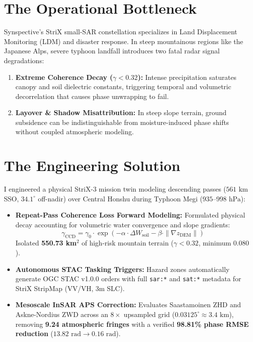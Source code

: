 \documentclass[10pt,letterpaper]{article}
\begin{document}
\noindent
\begin{minipage}[t]{0.51\textwidth}
    \section*{The Operational Bottleneck}
    \footnotesize
    Synspective's StriX small-SAR constellation specializes in Land Displacement Monitoring (LDM) and disaster response. In steep mountainous regions like the Japanese Alps, severe typhoon landfall introduces two fatal radar signal degradations:
    \begin{enumerate}[leftmargin=12pt,topsep=1pt,itemsep=1pt,parsep=0pt]
        \item \textbf{Extreme Coherence Decay ($\gamma < 0.32$):} Intense precipitation saturates canopy and soil dielectric constants, triggering temporal and volumetric decorrelation that causes phase unwrapping to fail.
        \item \textbf{Layover \& Shadow Misattribution:} In steep slope terrain, ground subsidence can be indistinguishable from moisture-induced phase shifts without coupled atmospheric modeling.
    \end{enumerate}

    \section*{The Engineering Solution}
    \footnotesize
    I engineered a physical StriX-3 mission twin modeling descending passes ($561\text{ km}$ SSO, $34.1^\circ$ off-nadir) over Central Honshu during Typhoon Megi ($935\text{--}998\text{ hPa}$):
    \begin{itemize}[leftmargin=12pt,topsep=1pt,itemsep=1pt,parsep=0pt]
        \item \textbf{Repeat-Pass Coherence Loss Forward Modeling:} Formulated physical decay accounting for volumetric water convergence and slope gradients:
        \begin{equation*}
            \gamma_{\text{CCD}} = \gamma_0 \cdot \exp\left(-\alpha \cdot \Delta W_{\text{soil}} - \beta \cdot \|\nabla z_{\text{DEM}}\|\right)
        \end{equation*}
        Isolated \textbf{550.73 km$^2$} of high-risk mountain terrain ($\gamma < 0.32$, minimum $0.080$).
        \item \textbf{Autonomous STAC Tasking Triggers:} Hazard zones automatically generate OGC STAC v1.0.0 orders with full \texttt{sar:*} and \texttt{sat:*} metadata for StriX StripMap (VV/VH, 3m SLC).
        \item \textbf{Mesoscale InSAR APS Correction:} Evaluates Saastamoinen ZHD and Askne-Nordius ZWD across an $8\times$ upsampled grid ($0.03125^\circ \approx 3.4\text{ km}$), removing \textbf{9.24 atmospheric fringes} with a verified \textbf{98.81\% phase RMSE reduction} ($13.82\text{ rad} \rightarrow 0.16\text{ rad}$).
    \end{itemize}


\end{minipage}
\end{document}
